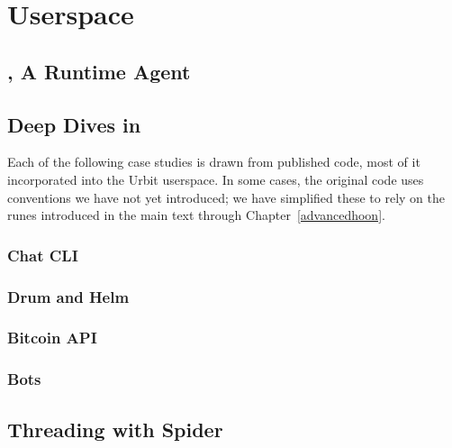 \setchapterpreamble[u]{\margintoc}
\chapter{Userspace}


\section{\gall, A Runtime Agent}



\section{Deep Dives in \gall}

Each of the following case studies is drawn from published code, most of it incorporated into the Urbit userspace.  In some cases, the original code uses conventions we have not yet introduced; we have simplified these to rely on the runes introduced in the main text through Chapter~\ref{advancedhoon}.

\subsection{Chat CLI}

\subsection{Drum and Helm}

\subsection{Bitcoin API}

\subsection{Bots}

\section{Threading with Spider}

